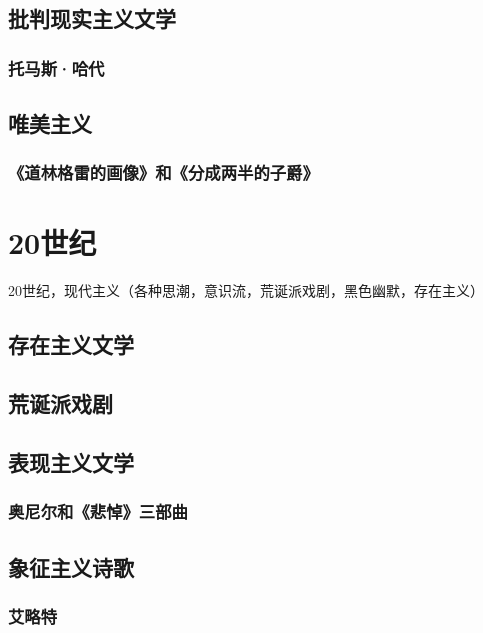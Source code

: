 \documentclass[UTF8]{../RepresentationUniverse}
\begin{document}
\section{批判现实主义文学}

\subsection{托马斯·哈代}


\section{唯美主义}

\subsection{《道林格雷的画像》和《分成两半的子爵》}




\chapter{20世纪}


20世纪，现代主义（各种思潮，意识流，荒诞派戏剧，黑色幽默，存在主义）



\section{存在主义文学}


\section{荒诞派戏剧}



\section{表现主义文学}

\subsection{奥尼尔和《悲悼》三部曲}



\section{象征主义诗歌}
\subsection{艾略特}
\end{document}
